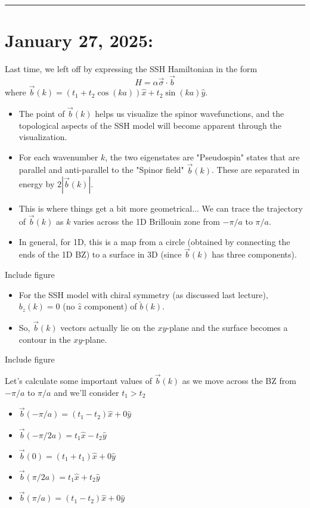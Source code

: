 \documentclass[11pt]{article}
\begin{document}
\vskip 1cm
\hrule

\pagebreak
\section{January 27, 2025:}

Last time, we left off by expressing the SSH Hamiltonian in the form $$ H = \alpha \vec{\sigma} \cdot \vec{b} $$ where $\vec{b}(k) = (t_1 + t_2 \cos(ka))\hat{x} + t_2 \sin(ka) \hat{y}$. 

\begin{itemize}
  \item The point of $\vec{b}(k)$ helps us visualize the spinor wavefunctions, and the topological aspects of the SSH model will become apparent through the visualization.
  
  \item For each wavenumber $k$, the two eigenstates are "Pseudospin" states that are parallel and anti-parallel to the "Spinor field" $\vec{b}(k)$. These are separated in energy by $2|\vec{b}(k)|$.

  \item This is where things get a bit more geometrical... We can trace the trajectory of $\vec{b}(k)$ as $k$ varies across the 1D Brillouin zone from $-\pi/a$ to $\pi/a$.
  
  \item In general, for 1D, this is a map from a circle (obtained by connecting the ends of the 1D BZ) to a surface in 3D (since $\vec{b}(k)$ has three components).
\end{itemize}

\begin{center}
  Include figure
\end{center}

\begin{itemize}
  \item For the SSH model with chiral symmetry (as discussed last lecture), $b_z(k) = 0$ (no $\hat{z}$ component) of $\breve{b}(k)$.
  
  \item So, $\vec{b}(k)$ vectors actually lie on the $xy$-plane and the surface becomes a contour in the $xy$-plane.
\end{itemize}

\begin{center}
  Include figure
\end{center} Let's calculate some important values of $\vec{b}(k)$ as we move across the BZ from $-\pi/a$ to $\pi/a$ and we'll consider $t_1 > t_2$
\begin{itemize}
  \item $\vec{b}(-\pi/a) = (t_1 - t_2)\hat{x} + 0\hat{y}$
  \item $\vec{b}(-\pi/2a) = t_1\hat{x} -t_2 \hat{y}$
  \item $\vec{b}(0) = (t_1 + t_1)\hat{x} + 0\hat{y}$
  \item $\vec{b}(\pi/2a) = t_1\hat{x} + t_2 \hat{y}$
  \item $\vec{b}(\pi/a) = (t_1 - t_2)\hat{x} + 0\hat{y}$
\end{itemize}
\end{document}

